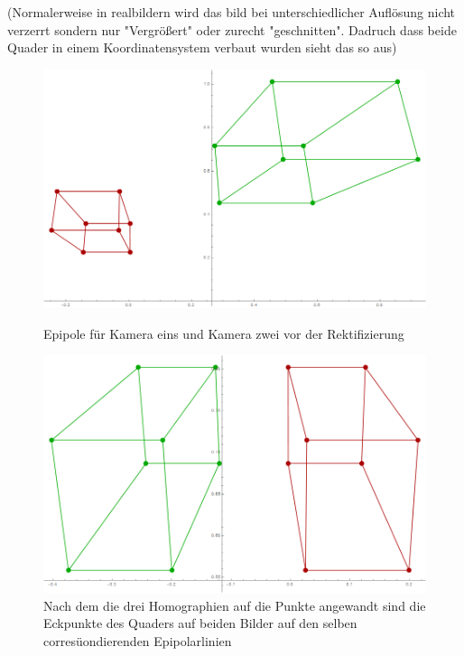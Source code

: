 (Normalerweise in realbildern wird das bild bei unterschiedlicher Auflösung nicht verzerrt sondern nur "Vergrößert" oder zurecht "geschnitten". Dadruch dass beide Quader in einem Koordinatensystem verbaut wurden sieht das so aus)


\begin{figure}[!htb]
	\includegraphics[width=\linewidth]{images/Rectification_Hp_different_Solutions.png}
	\caption{Epipole für Kamera eins und Kamera zwei vor der Rektifizierung}
	\endminipage\hfill
	\includegraphics[width=\linewidth]{images/Rectification_HrHp_different_Solutions.png}
	\caption{Nach dem die drei Homographien auf die Punkte angewandt sind die Eckpunkte des Quaders auf beiden Bilder auf den selben corresüondierenden Epipolarlinien}
	\endminipage\hfill
\end{figure}

